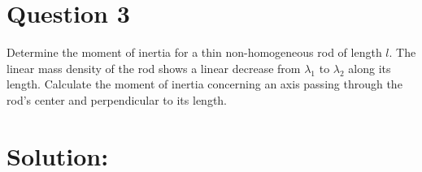 \section*{Question 3}
Determine the moment of inertia for a thin non-homogeneous rod of length $l$. The linear mass density of the rod shows a linear decrease \textit{} from $\lambda_1$ to $\lambda_2$ along its length. Calculate the moment of inertia concerning an axis passing through the rod's center and perpendicular to its length.

\section*{Solution:}